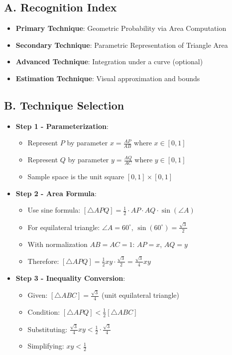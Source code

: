 \documentclass[11pt]{article}
\begin{document}
\begin{techniquesbox}
\subsection*{A. Recognition Index}
\begin{itemize}[leftmargin=*]
    \item \textbf{Primary Technique}: Geometric Probability via Area Computation
    \item \textbf{Secondary Technique}: Parametric Representation of Triangle Area
    \item \textbf{Advanced Technique}: Integration under a curve (optional)
    \item \textbf{Estimation Technique}: Visual approximation and bounds
\end{itemize}

\subsection*{B. Technique Selection}
\begin{itemize}[leftmargin=*]
    \item \textbf{Step 1 - Parameterization}: 
    \begin{itemize}
        \item Represent $P$ by parameter $x = \frac{AP}{AB}$ where $x \in [0,1]$
        \item Represent $Q$ by parameter $y = \frac{AQ}{AC}$ where $y \in [0,1]$
        \item Sample space is the unit square $[0,1] \times [0,1]$
    \end{itemize}
    
    \item \textbf{Step 2 - Area Formula}: 
    \begin{itemize}
        \item Use sine formula: $[\triangle APQ] = \frac{1}{2} \cdot AP \cdot AQ \cdot \sin(\angle A)$
        \item For equilateral triangle: $\angle A = 60^\circ$, $\sin(60^\circ) = \frac{\sqrt{3}}{2}$
        \item With normalization $AB = AC = 1$: $AP = x$, $AQ = y$
        \item Therefore: $[\triangle APQ] = \frac{1}{2}xy \cdot \frac{\sqrt{3}}{2} = \frac{\sqrt{3}}{4}xy$
    \end{itemize}
    
    \item \textbf{Step 3 - Inequality Conversion}: 
    \begin{itemize}
        \item Given: $[\triangle ABC] = \frac{\sqrt{3}}{4}$ (unit equilateral triangle)
        \item Condition: $[\triangle APQ] < \frac{1}{2}[\triangle ABC]$
        \item Substituting: $\frac{\sqrt{3}}{4}xy < \frac{1}{2} \cdot \frac{\sqrt{3}}{4}$
        \item Simplifying: $xy < \frac{1}{2}$
    \end{itemize}
    

\end{itemize}
\end{techniquesbox}
\end{document}
